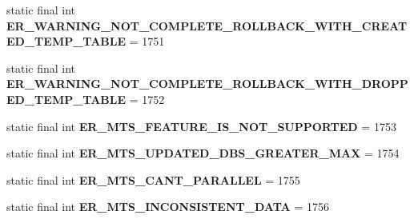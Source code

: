 \begin{DoxyCompactItemize}
\item 
\mbox{\label{classcom_1_1mysql_1_1jdbc_1_1_mysql_error_numbers_aa674778665d62b9b834164ec11577cbc}} 
static final int {\bfseries E\+R\+\_\+\+W\+A\+R\+N\+I\+N\+G\+\_\+\+N\+O\+T\+\_\+\+C\+O\+M\+P\+L\+E\+T\+E\+\_\+\+R\+O\+L\+L\+B\+A\+C\+K\+\_\+\+W\+I\+T\+H\+\_\+\+C\+R\+E\+A\+T\+E\+D\+\_\+\+T\+E\+M\+P\+\_\+\+T\+A\+B\+LE} = 1751
\item 
\mbox{\label{classcom_1_1mysql_1_1jdbc_1_1_mysql_error_numbers_aeeef93d536388a53366b5eaf8242f289}} 
static final int {\bfseries E\+R\+\_\+\+W\+A\+R\+N\+I\+N\+G\+\_\+\+N\+O\+T\+\_\+\+C\+O\+M\+P\+L\+E\+T\+E\+\_\+\+R\+O\+L\+L\+B\+A\+C\+K\+\_\+\+W\+I\+T\+H\+\_\+\+D\+R\+O\+P\+P\+E\+D\+\_\+\+T\+E\+M\+P\+\_\+\+T\+A\+B\+LE} = 1752
\item 
\mbox{\label{classcom_1_1mysql_1_1jdbc_1_1_mysql_error_numbers_a904227e013782473a62b3f23cf923640}} 
static final int {\bfseries E\+R\+\_\+\+M\+T\+S\+\_\+\+F\+E\+A\+T\+U\+R\+E\+\_\+\+I\+S\+\_\+\+N\+O\+T\+\_\+\+S\+U\+P\+P\+O\+R\+T\+ED} = 1753
\item 
\mbox{\label{classcom_1_1mysql_1_1jdbc_1_1_mysql_error_numbers_a5a07c147382d6109473658e324871b1a}} 
static final int {\bfseries E\+R\+\_\+\+M\+T\+S\+\_\+\+U\+P\+D\+A\+T\+E\+D\+\_\+\+D\+B\+S\+\_\+\+G\+R\+E\+A\+T\+E\+R\+\_\+\+M\+AX} = 1754
\item 
\mbox{\label{classcom_1_1mysql_1_1jdbc_1_1_mysql_error_numbers_aa1e4a207172517f4097a53d89628ef06}} 
static final int {\bfseries E\+R\+\_\+\+M\+T\+S\+\_\+\+C\+A\+N\+T\+\_\+\+P\+A\+R\+A\+L\+L\+EL} = 1755
\item 
\mbox{\label{classcom_1_1mysql_1_1jdbc_1_1_mysql_error_numbers_a717d290a0ec8f7ea4bf7e2edb28a84d6}} 
static final int {\bfseries E\+R\+\_\+\+M\+T\+S\+\_\+\+I\+N\+C\+O\+N\+S\+I\+S\+T\+E\+N\+T\+\_\+\+D\+A\+TA} = 1756
\item 
\mbox{\label{classcom_1_1mysql_1_1jdbc_1_1_mysql_error_numbers_ab8f9b1c802ffec83b8428e75a6cfd723}} 

\end{DoxyCompactItemize}
